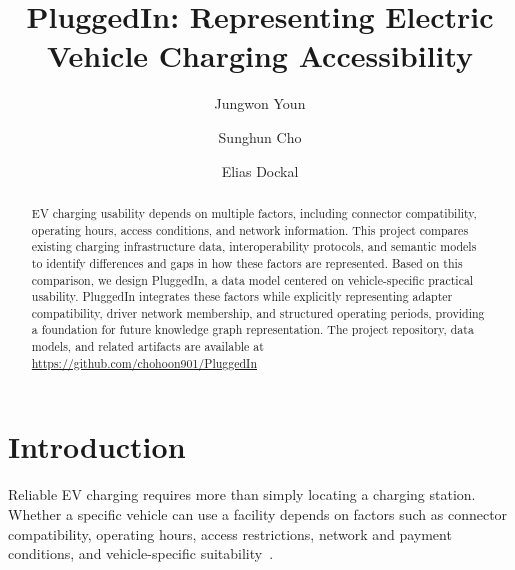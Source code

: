 \documentclass[sigconf]{acmart}
\begin{document}
\title{PluggedIn: Representing Electric Vehicle Charging Accessibility}

\author{Jungwon Youn}

\author{Sunghun Cho}

\author{Elias Dockal}


\begin{abstract}
EV charging usability depends on multiple factors, including connector compatibility, operating hours, access conditions, and network information. This project compares existing charging infrastructure data, interoperability protocols, and semantic models to identify differences and gaps in how these factors are represented. Based on this comparison, we design PluggedIn, a data model centered on vehicle-specific practical usability. PluggedIn integrates these factors while explicitly representing adapter compatibility, driver network membership, and structured operating periods, providing a foundation for future knowledge graph representation. The project repository, data models, and related artifacts are available at \url{https://github.com/chohoon901/PluggedIn}
\end{abstract}


\maketitle

\section{Introduction}
Reliable EV charging requires more than simply locating a charging station. Whether a specific vehicle can use a facility depends on factors such as connector compatibility, operating hours, access restrictions, network and payment conditions, and vehicle-specific suitability~\cite{evkg}.
\end{document}
